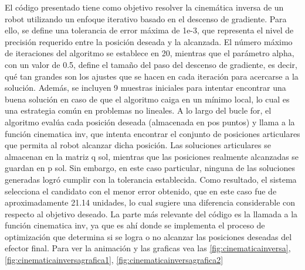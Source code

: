 El código presentado tiene como objetivo resolver la cinemática inversa de un robot utilizando un enfoque iterativo basado en el descenso de gradiente. Para ello, se define una tolerancia de error máxima de 1e-3, que representa el nivel de precisión requerido entre la posición deseada y la alcanzada. El número máximo de iteraciones del algoritmo se establece en 20, mientras que el parámetro alpha, con un valor de 0.5, define el tamaño del paso del descenso de gradiente, es decir, qué tan grandes son los ajustes que se hacen en cada iteración para acercarse a la solución. Además, se incluyen 9 muestras iniciales para intentar encontrar una buena solución en caso de que el algoritmo caiga en un mínimo local, lo cual es una estrategia común en problemas no lineales. A lo largo del bucle for, el algoritmo evalúa cada posición deseada (almacenada en pos puntos) y llama a la función cinematica inv, que intenta encontrar el conjunto de posiciones articulares que permita al robot alcanzar dicha posición. Las soluciones articulares se almacenan en la matriz q sol, mientras que las posiciones realmente alcanzadas se guardan en p sol. Sin embargo, en este caso particular, ninguna de las soluciones generadas logró cumplir con la tolerancia establecida. Como resultado, el sistema selecciona el candidato con el menor error obtenido, que en este caso fue de aproximadamente 21.14 unidades, lo cual sugiere una diferencia considerable con respecto al objetivo deseado. La parte más relevante del código es la llamada a la función cinematica inv, ya que es ahí donde se implementa el proceso de optimización que determina si se logra o no alcanzar las posiciones deseadas del efector final. Para ver la animación y las graficas vea las \autoref{fig:cinematicainversa}, \autoref{fig:cinematicainversagrafica1}, \autoref{fig:cinematicainversagrafica2}